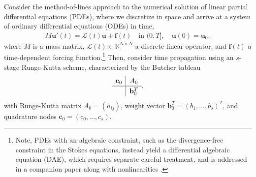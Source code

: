 \documentclass[review]{siamart}
\begin{document}
Consider the method-of-lines approach to the numerical solution of linear
partial differential equations (PDEs), where we discretize in space and arrive
at a system of ordinary differential equations (ODEs) in time,
%
\begin{align*}
M\mathbf{u}'(t) =  \mathcal{L}(t)\mathbf{u} + \mathbf{f}(t)
	\quad\text{in }(0,T], \quad \mathbf{u}(0) = \mathbf{u}_0,
\end{align*}
%
where $M$ is a mass matrix, $\mathcal{L}(t)\in\mathbb{R}^{N\times N}$ a discrete
linear operator, and $\mathbf{f}(t)$ a time-dependent forcing
function.\footnote{Note,
PDEs with an algebraic constraint, such as the divergence-free
constraint in the Stokes equations, instead yield a differential algebraic equation (DAE), which
requires separate careful treatment, and is addressed in a companion paper along with
nonlinearities \cite{irk2}.}
Then, consider time propagation using an $s$-stage Runge-Kutta scheme,
characterized by the Butcher tableau
%
\begin{align*}
	\renewcommand\arraystretch{1.2}
	\begin{array}
	{c|c}
	\mathbf{c}_0 & A_0\\
	\hline
	& \mathbf{b}_0^T
	\end{array},
\end{align*}
%
with Runge-Kutta matrix $A_0 = (a_{ij})$, weight vector $\mathbf{b}_0^T = (b_1,
\ldots, b_s)^T$, and quadrature nodes $\mathbf{c}_0 = (c_0, \ldots, c_s)$.
\end{document}
